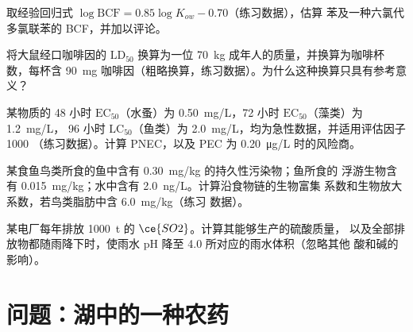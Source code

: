 \begin{exercise}[$\star\star$]\label{exo:b3:environmental-toxicology:8}
取经验回归式 $\log\mathrm{BCF} = 0.85\log K_{ow} - 0.70$（练习数据），估算
苯及一种六氯代多氯联苯的 BCF，并加以评论。
\end{exercise}

\begin{exercise}[$\star\star$]\label{exo:b3:environmental-toxicology:9}
将大鼠经口咖啡因的 $\mathrm{LD_{50}}$ 换算为一位 \qty{70}{kg} 成年人的质量，并换算为咖啡杯数，每杯含
\qty{90}{mg} 咖啡因（粗略换算，练习数据）。为什么这种换算只具有参考意义？
\end{exercise}

\begin{exercise}[$\star\star\star$]\label{exo:b3:environmental-toxicology:10}
某物质的 48 小时 $\mathrm{EC_{50}}$（水蚤）为 \qty{0.50}{mg/L}，72 小时 $\mathrm{EC_{50}}$（藻类）为 \qty{1.2}{mg/L}，
96 小时 $\mathrm{LC_{50}}$（鱼类）为 \qty{2.0}{mg/L}，均为急性数据，并适用评估因子 1000
（练习数据）。计算 PNEC，以及 PEC 为 \qty{0.20}{\micro g/L} 时的风险商。
\end{exercise}

\begin{exercise}[$\star\star\star$]\label{exo:b3:environmental-toxicology:11}
某食鱼鸟类所食的鱼中含有 \qty{0.30}{mg/kg} 的持久性污染物；鱼所食的
浮游生物含有 \qty{0.015}{mg/kg}；水中含有 \qty{2.0}{ng/L}。计算沿食物链的生物富集
系数和生物放大系数，若鸟类脂肪中含 \qty{6.0}{mg/kg}（练习
数据）。
\end{exercise}

\begin{exercise}[$\star\star\star$]\label{exo:b3:environmental-toxicology:12}
某电厂每年排放 \qty{1000}{t} 的 $\ce{SO2}$。计算其能够生产的硫酸质量，
以及全部排放物都随雨降下时，使雨水 pH 降至 4.0 所对应的雨水体积（忽略其他
酸和碱的影响）。
\end{exercise}

\section{问题：湖中的一种农药}

